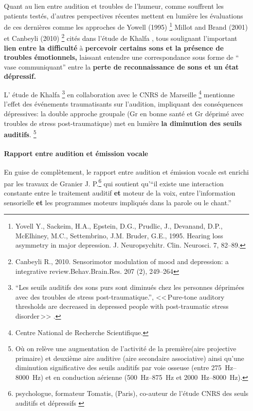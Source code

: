 Quant au lien entre audition et troubles de l'humeur, comme souffrent
les patients testés, d'autres perspectives
récentes mettent en lumière les évaluations de ces dernières comme les
approches de Yowell (1995) \footnote{Yovell
  Y., Sackeim, H.A., Epstein, D.G., Prudlic, J., Devanand, D.P.,
  McElhiney, M.C., Settembrino, J.M. Bruder, G.E., 1995. Hearing loss
  asymmetry in major depression. J. Neuropsychitr. Clin. Neurosci. 7,
  82--89.} Millot and Brand (2001) et
Canbeyli (2010) \footnote{Canbeyli R., 2010. Sensorimotor modulation of mood and
depression: a integrative review.Behav.Brain.Res. 207 (2), 249--264}
cités dans l'étude de Khalfa \autocite{affectiveDisorders}, tous soulignant l'important\textbf{ lien entre la difficulté}
à \textbf{percevoir certains sons et la présence de troubles émotionnels,}
laissant entendre une correspondance sous forme de `` vase communiquant''
entre la \textbf{perte de reconnaissance de
sons et un état dépressif.}

L' étude de Khalfa \footnote{``Les seuils auditifs des sons purs
	sont diminués chez les personnes déprimées avec des
	troubles de stress post-traumatique.'', <<\,Pure-tone auditory
	thresholds are decreased in depressed people with post-traumatic stress
disorder\,>>
	.} \autocite{affectiveDisorders} en collaboration avec
le CNRS de Marseille \footnote{Centre National de Recherche Scientifique.}  mentionne l'effet des événements
traumatisants sur l'audition, impliquant des conséquences dépressives:
la double approche groupale (Gr en bonne santé et Gr déprimé avec
troubles de stress post-traumatique) met en lumière \textbf{la diminution des
  seuils auditifs}. %
\footnote{Où on relève une augmentation de l'activité de la
première(aire projective primaire)  et deuxième aire auditive (aire
secondaire associative) ainsi qu'une diminution significative des
seuils auditifs par voie osseuse (entre
\SIrange{275}{8000}{\Hz}) et en conduction aérienne
(\SIrange{500}{875}{\Hz} et  \SIrange{2000}{8000}{\Hz}).}

\paragraph{Rapport entre audition et émission vocale}

En guise de complètement, le rapport entre audition et émission vocale
est enrichi par les travaux de Granier J. P.\footnote{psychologue, formateur
Tomatis, (Paris), co-auteur de l'étude CNRS des seuls auditifs et
dépressifs \autocite{affectiveDisorders} }
qui soutient qu'``il existe une
interaction
constante entre le traitement auditif \textbf{et} moteur de la
voix, entre l'information sensorielle \textbf{et} les programmes moteurs impliqués
dans la parole ou le chant.''



